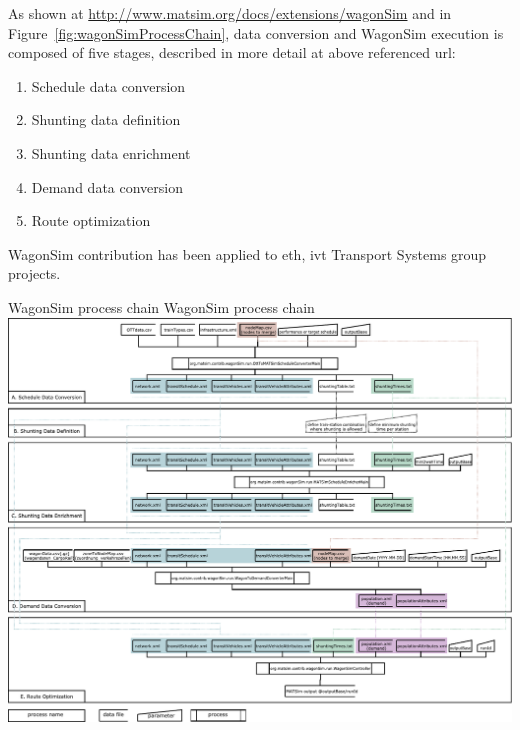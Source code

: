 As shown at \url{http://www.matsim.org/docs/extensions/wagonSim} and in Figure~\ref{fig:wagonSimProcessChain}, data conversion and WagonSim execution is composed of five stages, described in more detail at above referenced url:
%
\begin{enumerate}[label=\emph{\Alph*})]
\item Schedule data conversion
\item Shunting data definition
\item Shunting data enrichment
\item Demand data conversion
\item Route optimization
\end{enumerate}
%
WagonSim \gls{contribution} has been applied to \gls{eth}, \gls{ivt} Transport Systems group projects.

\createfigure%
{WagonSim process chain}%
{WagonSim process chain}%
{\label{fig:wagonSimProcessChain}}%
{\includegraphics[width=1.22\textwidth,angle=90]{extending/figures/wagonsim/processChainsCompact}}%
{}

